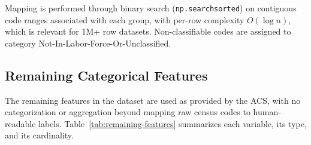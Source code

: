 Mapping is performed through binary search (\texttt{np.searchsorted}) on contiguous code ranges associated with each group, with per-row complexity $O(\log n)$, which is relevant for 1M+ row datasets. Non-classifiable codes are assigned to category Not-In-Labor-Force-Or-Unclassified.

\subsection{Remaining Categorical Features}
\label{sec:remaining-features}

The remaining features in the dataset are used as provided by the ACS, with no categorization or aggregation beyond mapping raw census codes to human-readable labels. Table~\ref{tab:remaining-features} summarizes each variable, its type, and its cardinality.

